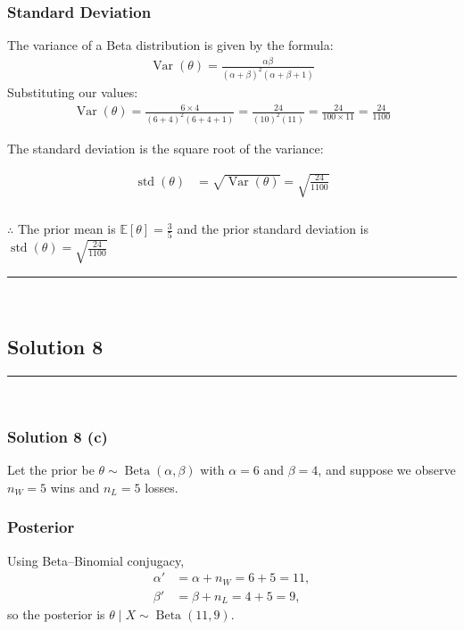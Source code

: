 \documentclass{article}
\begin{document}
\subsubsection*{Standard Deviation}
The variance of a Beta distribution is given by the formula:
\begin{align*}
    \operatorname{Var}(\theta) = \frac{\alpha \beta}{(\alpha + \beta)^2 (\alpha + \beta + 1)}
\end{align*}
Substituting our values:
\begin{align*}
    \operatorname{Var}(\theta) = \frac{6 \times 4}{(6 + 4)^2 (6 + 4 + 1)} = \frac{24}{(10)^2 (11)} = \frac{24}{100 \times 11} = \frac{24}{1100}
\end{align*}
\begin{flushleft}
    The standard deviation is the square root of the variance:
\end{flushleft}

\begin{align*}
    \operatorname{std}(\theta) &= \sqrt{\operatorname{Var}(\theta)} = \sqrt{\frac{24}{1100}} 
\end{align*}

\subsubsection*{\normalfont}{$\therefore$ The prior mean is $\mathbb{E}[\theta] = \frac{3}{5}$ and the prior standard deviation is $\operatorname{std}(\theta) = \sqrt{\frac{24}{1100}}$} \\

\noindent\rule{\textwidth}{0.4pt}\\

\newpage

\subsection*{Solution 8}
\noindent\rule{\textwidth}{0.4pt}\\
\subsubsection*{Solution 8 (c)}
Let the prior be $\theta \sim \operatorname{Beta}(\alpha,\beta)$ with $\alpha=6$ and $\beta=4$, and suppose we observe $n_W=5$ wins and $n_L=5$ losses.

\subsubsection*{Posterior}
Using Beta–Binomial conjugacy,
\begin{align*}
    \alpha' &= \alpha + n_W = 6 + 5 = 11, \\
    \beta'  &= \beta + n_L = 4 + 5 = 9,
\end{align*}
so the posterior is $\theta \mid X \sim \operatorname{Beta}(11, 9)$.
\end{document}
